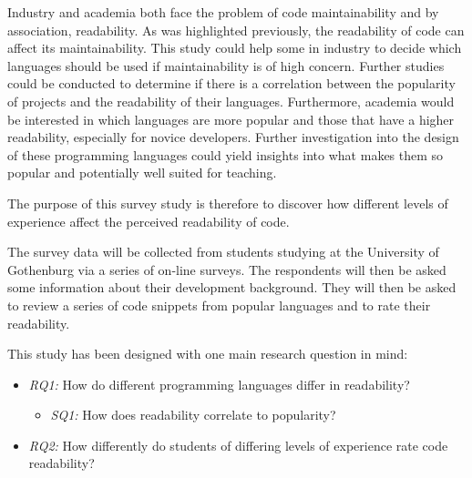 \documentclass[10pt,twocolumn]{article}
\begin{document}


Industry and academia both face the problem of code maintainability and by association, readability. As was highlighted previously, the readability of code can affect its maintainability. This study could help some in industry to decide which languages should be used if maintainability is of high concern. Further studies could be conducted to determine if there is a correlation between the popularity of projects and the readability of their languages. Furthermore, academia would be interested in which languages are more popular and those that have a higher readability, especially for novice developers. Further investigation into the design of these programming languages could yield insights into what makes them so popular and potentially well suited for teaching.

The purpose of this survey study is therefore to discover how different levels of experience affect the perceived readability of code.

The survey data will be collected from students studying at the University of Gothenburg via a series of on-line surveys. The respondents will then be asked some information about their development background. They will then be asked to review a series of code snippets from popular languages and to rate their readability. 

This study has been designed with one main research question in mind:
\begin{itemize}
\item \textit{RQ1:} How do different programming languages differ in readability?
\begin{itemize}
\item \textit{SQ1:} How does readability correlate to popularity?
\end{itemize}
\item \textit{RQ2:} How differently do students of differing levels of experience rate code readability?
\end{itemize}
\end{document}
